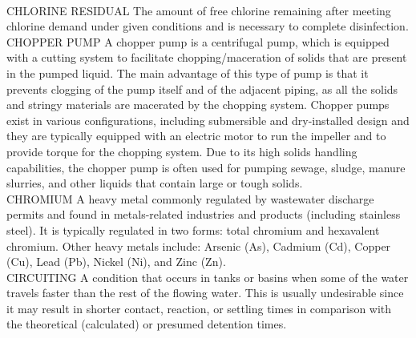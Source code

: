 \vspace{0.3cm}\\
CHLORINE RESIDUAL
The amount of free chlorine remaining after meeting chlorine demand under given conditions and is necessary to complete disinfection.
\vspace{0.3cm}\\
CHOPPER PUMP
A chopper pump is a centrifugal pump, which is equipped with a cutting system to facilitate chopping/maceration of solids that are present in the pumped liquid. The main advantage of this type of pump is that it prevents clogging of the pump itself and of the adjacent piping, as all the solids and stringy materials are macerated by the chopping system. Chopper pumps exist in various configurations, including submersible and dry-installed design and they are typically equipped with an electric motor to run the impeller and to provide torque for the chopping system. Due to its high solids handling capabilities, the chopper pump is often used for pumping sewage, sludge, manure slurries, and other liquids that contain large or tough solids.
\vspace{0.3cm}\\
CHROMIUM
A heavy metal commonly regulated by wastewater discharge permits and found in metals-related industries and products (including stainless steel). It is typically regulated in two forms: total chromium and hexavalent chromium. Other heavy metals include: Arsenic (As), Cadmium (Cd), Copper (Cu), Lead (Pb), Nickel (Ni), and Zinc (Zn).
\vspace{0.3cm}\\
CIRCUITING
A condition that occurs in tanks or basins when some of the water travels faster than the rest of the flowing water. This is usually undesirable since it may result in shorter contact, reaction, or settling times in comparison with the theoretical (calculated) or presumed detention times.
\vspace{0.3cm}\\

